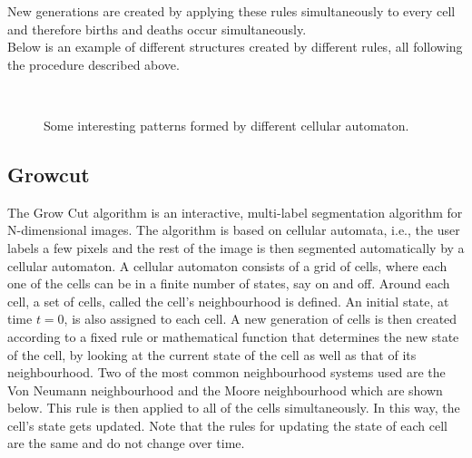 \documentclass[a4paper,10pt]{article}
\begin{document}
New generations are created by applying these rules simultaneously to every cell and therefore births and deaths occur simultaneously. \\

Below is an example of different structures created by different rules, all following the procedure described above.

\begin{figure}[H]
\centering
\mbox{ \quad
{}}
\caption{Some interesting patterns formed by different cellular automaton.}
\end{figure}

\subsection{Growcut}
\label{growcut}
The Grow Cut algorithm is an interactive, multi-label segmentation algorithm
for N-dimensional images.  The algorithm is based on cellular automata, i.e.,
the user labels a few pixels and the rest of the image is then segmented
automatically by a cellular automaton.  A cellular automaton consists of a
grid of cells, where each one of the cells can be in a finite number of
states, say on and off.   Around each cell, a set of cells, called the cell's
neighbourhood is defined.  An initial state, at time $t = 0$, is also assigned
to each cell.
A new generation of cells is then created according to a fixed rule or
mathematical function that determines the new state of the cell, by looking at
the current state of the cell as well
as that of its neighbourhood.  Two of the most common neighbourhood systems used are the Von
Neumann neighbourhood and the Moore neighbourhood which are shown below.
This rule
is then applied to all of the cells simultaneously.  In this way, the cell's
state gets updated.  Note that the rules for updating the state of each cell are
the same and do not
change over time. \\
\end{document}
